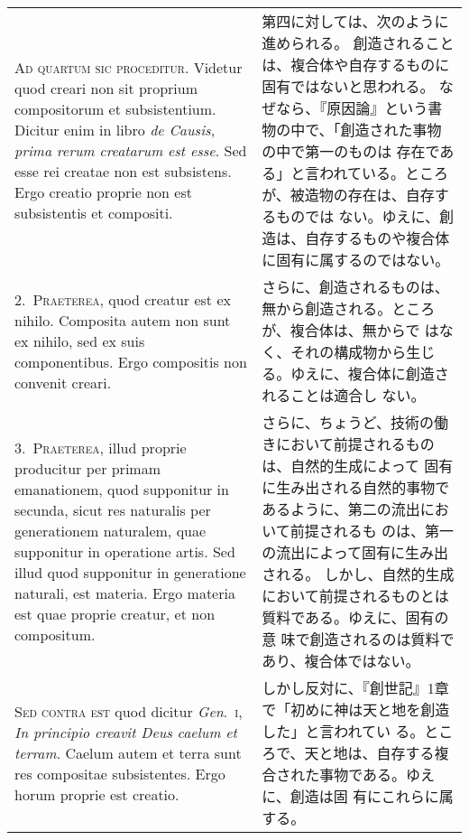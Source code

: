 \documentclass[10pt]{jsarticle} %
\begin{document}
\begin{longtable}{p{21em}p{21em}}

{\huge A}{\scshape d quartum sic proceditur}. Videtur quod creari non
sit proprium compositorum et subsistentium. Dicitur enim in libro
{\itshape de Causis}, {\itshape prima rerum creatarum est esse}. Sed
esse rei creatae non est subsistens. Ergo creatio proprie non est
subsistentis et compositi.


&
第四に対しては、次のように進められる。
創造されることは、複合体や自存するものに固有ではないと思われる。
なぜなら、『原因論』という書物の中で、「創造された事物の中で第一のものは
 存在である」と言われている。ところが、被造物の存在は、自存するものでは
 ない。ゆえに、創造は、自存するものや複合体に固有に属するのではない。

\\


2.~{\scshape Praeterea}, quod creatur est ex
nihilo. Composita autem non sunt ex nihilo, sed ex suis
componentibus. Ergo compositis non convenit creari.


&

さらに、創造されるものは、無から創造される。ところが、複合体は、無からで
 はなく、それの構成物から生じる。ゆえに、複合体に創造されることは適合し
 ない。

\\


3.~{\scshape Praeterea}, illud proprie producitur per
primam emanationem, quod supponitur in secunda, sicut res naturalis per
generationem naturalem, quae supponitur in operatione artis. Sed illud
quod supponitur in generatione naturali, est materia. Ergo materia est
quae proprie creatur, et non compositum.


&

さらに、ちょうど、技術の働きにおいて前提されるものは、自然的生成によって
 固有に生み出される自然的事物であるように、第二の流出において前提されるも
 のは、第一の流出によって固有に生み出される。
しかし、自然的生成において前提されるものとは質料である。ゆえに、固有の意
 味で創造されるのは質料であり、複合体ではない。

\\


{\scshape Sed contra est} quod dicitur {\itshape Gen}.~{\scshape i},
{\itshape In principio creavit Deus caelum et terram}. Caelum autem et
terra sunt res compositae subsistentes. Ergo horum proprie est creatio.


&
しかし反対に、『創世記』1章で「初めに神は天と地を創造した」と言われてい
 る。ところで、天と地は、自存する複合された事物である。ゆえに、創造は固
 有にこれらに属する。


\end{longtable}
\end{document}
